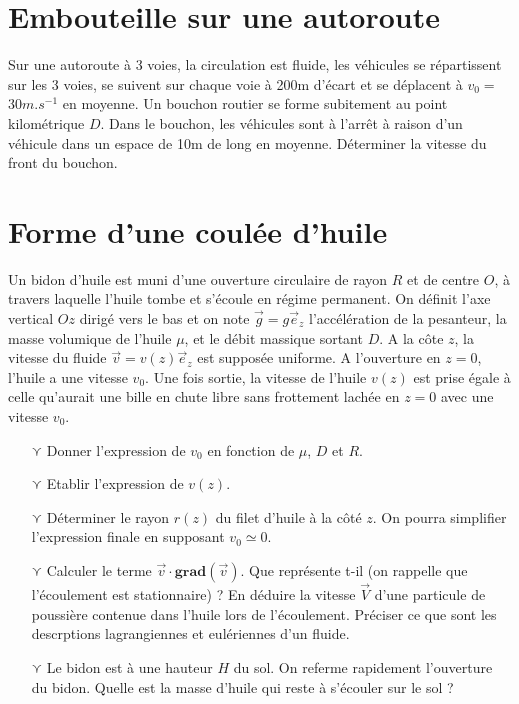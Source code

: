 \documentclass{report}
\begin{document}
\newpage

\section*{Embouteille sur une autoroute}

Sur une autoroute à 3 voies, la circulation est fluide, les véhicules se répartissent sur les 3 voies, se suivent sur chaque voie à 200m d'écart et se déplacent à $v_0=$30$m.s^{-1}$ en moyenne. Un bouchon routier se forme subitement au point kilométrique $D$. Dans le bouchon, les véhicules sont à l'arrêt à raison d'un véhicule dans un espace de 10m de long en moyenne. Déterminer la vitesse du front du bouchon.

\newpage

\section*{Forme d'une coulée d'huile}

Un bidon d'huile est muni d'une ouverture circulaire de rayon $R$ et de centre $O$, à travers laquelle l'huile tombe et s'écoule en régime permanent. On définit l'axe vertical $Oz$ dirigé vers le bas et on note $\vec{g}=g\vec{e}_z$ l'accélération de la pesanteur, la masse volumique de l'huile $\mu$, et le débit massique sortant $D$. A la côte $z$, la vitesse du fluide $\vec{v}=v(z)\vec{e}_z$ est supposée uniforme. A l'ouverture en $z=0$, l'huile a une vitesse $v_0$. Une fois sortie, la vitesse de l'huile $v(z)$ est prise égale à celle qu'aurait une bille en chute libre sans frottement lachée en $z=0$ avec une vitesse $v_0$. 

\begin{itemize}

	\item[$\curlyvee$] Donner l'expression de $v_0$ en fonction de $\mu$, $D$ et $R$.
	
	\item[$\curlyvee$] Etablir l'expression de $v(z)$.
	
	\item[$\curlyvee$] Déterminer le rayon $r(z)$ du filet d'huile à la côté $z$. On pourra simplifier l'expression finale en supposant $v_0\simeq0$.
	
	\item[$\curlyvee$] Calculer le terme $\vec{v}\cdot\mathbf{grad}(\vec{v})$. Que représente t-il (on rappelle que l'écoulement est stationnaire) ? En déduire la vitesse $\vec{V}$ d'une particule de poussière contenue dans l'huile lors de l'écoulement. Préciser ce que sont les descrptions lagrangiennes et eulériennes d'un fluide.
	
	\item[$\curlyvee$] Le bidon est à une hauteur $H$ du sol. On referme rapidement l'ouverture du bidon. Quelle est la masse d'huile qui reste à s'écouler sur le sol ?

\end{itemize}
\end{document}
